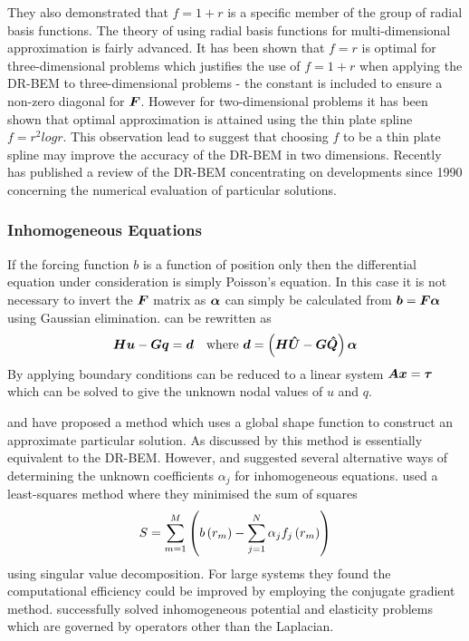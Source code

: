 They also demonstrated that $f = 1 + r$ is a specific member of the group
of radial basis functions.  The theory of using radial basis functions for
multi-dimensional approximation is fairly advanced.  It has been shown that
$f = r$ is optimal for three-dimensional problems which justifies the use
of $f = 1 + r$ when applying the DR-BEM to three-dimensional problems - the
constant is included to ensure a non-zero diagonal for $\matr{F}$.  However
for two-dimensional problems it has been shown that optimal approximation
is attained using the thin plate spline $f = r^{2} log r$.  This
observation lead  to suggest that choosing $f$ to be a
thin plate spline may improve the accuracy of the DR-BEM in two dimensions.
Recently  has published a review of the DR-BEM
concentrating on developments since 1990 concerning the numerical
evaluation of particular solutions.

\subsubsection{Inhomogeneous Equations}

If the forcing function $b$ is a function 
of position only then the differential equation under consideration 
is simply Poisson's equation. In this case it is not necessary to 
invert the $\matr{F}$ matrix as $\vect{\alpha}$ can simply be calculated from 
$\vect{b} = \matr{F} \vect{\alpha}$ using Gaussian
elimination.  can be rewritten as
\begin{equation}
  \matr{H} \vect{u} - \matr{G} \vect{q} = \vect{d}\quad\text{where
    }\vect{d} = \pbrac{\matr{H} \matr{\hat{U}} - \matr{G} \matr{\hat{Q}}}
  \vect{\alpha}
\label{eq:drmpoisson}
\end{equation}
By applying boundary 
conditions  can be 
reduced to a linear system $\matr{A} \vect{x} = \vect{\tau}$ which can be
solved to give the unknown nodal values of $u$ and $q$.

 and  have proposed
a method which uses a global shape function to construct an approximate
particular solution.  As discussed by  this method
is essentially equivalent to the DR-BEM.  However,
 and  suggested several
alternative ways of determining the unknown coefficients $\alpha_{j}$ for
inhomogeneous equations.   used a least-squares
method where they minimised the sum of squares
\begin{equation}
  S =  \displaystyle\sum_{m=1}^{M}  \left(  b\left( r_{m} \right)  -  \displaystyle\sum_{j=1}^{N} 
    \alpha_{j}  f_{j}\left( r_{m} \right)  \right)
\end{equation}
using singular value decomposition.  For large systems they found the
computational efficiency could be improved by employing the conjugate
gradient method.   successfully solved
inhomogeneous potential and elasticity problems which are governed by
operators other than the Laplacian.

